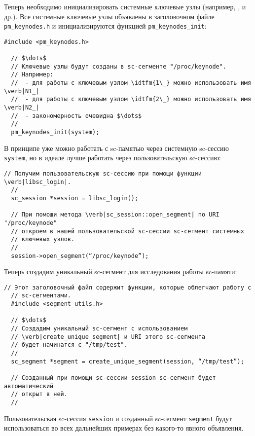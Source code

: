 Теперь необходимо инициализировать системные ключевые узлы (например,
,  и др.). Все системные ключевые узлы объявлены в
заголовочном файле \verb|pm_keynodes.h| и инициализируются функцией
\lstinline{pm_keynodes_init}:

\begin{lstlisting}[texcl]
  #include <pm_keynodes.h>

  // $\dots$
  // Ключевые узлы будут созданы в sc-сегменте "/proc/keynode".
  // Например:
  //  - для работы с ключевым узлом \idtfm{1\_} можно использовать имя \verb|N1_|
  //  - для работы с ключевым узлом \idtfm{2\_} можно использовать имя \verb|N2_|
  //  - закономерность очевидна $\dots$
  //
  pm_keynodes_init(system);
\end{lstlisting}

В принципе уже можно работать с sc-памятью через системную sc-сессию
\lstinline{system}, но в идеале лучше работать через пользовательскую
sc-сессию:

\begin{lstlisting}[texcl]
  // Получим пользовательскую sc-сессию при помощи функции \verb|libsc_login|.
  //
  sc_session *session = libsc_login();

  // При помощи метода \verb|sc_session::open_segment| по URI "/proc/keynode"
  // откроем в нашей пользовательской sc-сессии sc-сегмент системных
  // ключевых узлов.
  //
  session->open_segment(“/proc/keynode”);
\end{lstlisting}

Теперь создадим уникальный sc-сегмент для исследования работы
sc-памяти:

\begin{lstlisting}[texcl]
  // Этот заголовочный файл содержит функции, которые облегчают работу с
  // sc-сегментами.
  #include <segment_utils.h>

  // $\dots$
  // Создадим уникальный sc-сегмент с использованием
  // \verb|create_unique_segment| и URI этого sc-сегмента
  // будет начинатся с "/tmp/test".
  //
  sc_segment *segment = create_unique_segment(session, “/tmp/test”);

  // Созданный при помощи sc-сессии session sc-сегмент будет автоматический
  // открыт в ней.
  //
\end{lstlisting}

Пользовательская sc-сессия \lstinline{session} и созданный sc-сегмент
\lstinline{segment} будут использоваться во всех дальнейших примерах
без какого-то явного объявления.

